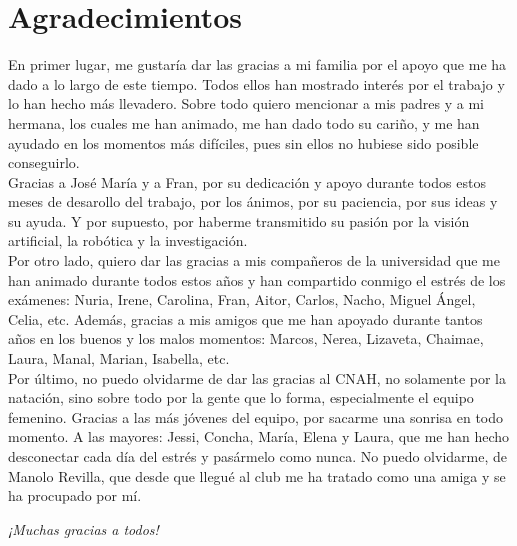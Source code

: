 \chapter*{Agradecimientos}

En primer lugar, me gustaría dar las gracias a mi familia por el apoyo que me ha dado a lo largo de este tiempo. Todos ellos han mostrado interés por el trabajo y lo han hecho más llevadero. Sobre todo quiero mencionar a mis padres y a mi hermana, los cuales me han animado, me han dado todo su cariño, y me han ayudado en los momentos más difíciles, pues sin ellos no hubiese sido posible conseguirlo.\\

Gracias a José María y a Fran, por su dedicación y apoyo durante todos estos meses de desarollo del trabajo, por los ánimos, por su paciencia, por sus ideas y su ayuda. Y por supuesto, por haberme transmitido su pasión por la visión artificial, la robótica y la investigación.\\

Por otro lado, quiero dar las gracias a mis compañeros de la universidad que me han animado durante todos estos años y han compartido conmigo el estrés de los exámenes: Nuria, Irene, Carolina, Fran, Aitor, Carlos, Nacho, Miguel Ángel, Celia, etc. Además, gracias a mis amigos que me han apoyado durante tantos años en los buenos y los malos momentos: Marcos, Nerea, Lizaveta, Chaimae, Laura, Manal, Marian,  Isabella, etc.\\

Por último, no puedo olvidarme de dar las gracias al CNAH, no solamente por la natación, sino sobre todo por la gente que lo forma, especialmente el equipo femenino. Gracias a las más jóvenes del equipo, por sacarme una sonrisa en todo momento. A las mayores: Jessi, Concha, María, Elena y Laura, que me han hecho desconectar cada día del estrés y pasármelo como nunca. No puedo olvidarme, de Manolo Revilla, que desde que llegué al club me ha tratado como una amiga y se ha procupado por mí.\\


\begin{flushright}
	\emph{¡Muchas gracias a todos!}
\end{flushright}